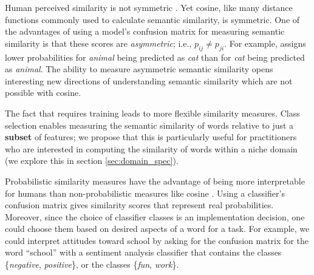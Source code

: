  Human perceived similarity is not symmetric \cite{tversky1977features}. Yet cosine, like many distance functions commonly used to calculate semantic similarity, is symmetric. One of the advantages of using a model's confusion matrix for measuring semantic similarity is that these scores are \textit{asymmetric}; i.e., $p_{ij} \not= {p_{ji}}$. For example, \wc assigns lower probabilities for \textit{animal} being predicted as \textit{cat} than for \textit{cat} being predicted as \textit{animal}. The ability to measure asymmetric semantic similarity opens interesting new directions of understanding semantic similarity which are not possible with cosine.

 The fact that {\wc} requires training leads to more flexible similarity measures. Class selection enables measuring the semantic similarity of words relative to just a \textbf{subset} of features; we propose that this is particularly useful for practitioners who are interested in computing the similarity of words within a niche domain (we explore this in section \ref{sec:domain_spec}). 

Probabilistic similarity measures have the advantage of being more interpretable for humans than non-probabilistic measures like cosine  \cite{sohangir2017improved}. Using a classifier's confusion matrix gives similarity scores that represent real probabilities. Moreover, since the choice of classifier classes is an implementation decision, one could choose them based on desired aspects of a word for a task. For example, we could interpret attitudes toward school by asking for the confusion matrix for the word ``school'' with a sentiment analysis classifier that contains the classes \{\textit{negative}, \textit{positive}\}, or the classes \{\textit{fun}, \textit{work}\}. 